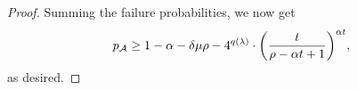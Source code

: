 \begin{proof}
  Summing the failure probabilities, we now get
  \[
    p_{\advA} \ge 1 - \alpha - \delta \mu \rho
    - 4^{q(\lambda)} \cdot \left( \frac{t}{\rho - \alpha t + 1} \right)^{\alpha t},
  \]
  as desired.
\end{proof}


